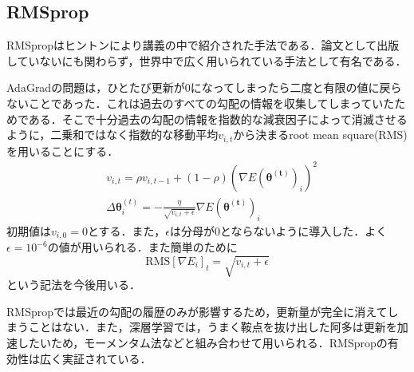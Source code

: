 \documentclass[a4paper,11pt]{jsreport}
\begin{document}
\subsection{RMSprop}
RMSpropはヒントンにより講義の中で紹介された手法である．論文として出版していないにも関わらず，世界中で広く用いられている手法として有名である．\par
AdaGradの問題は，ひとたび更新が$0$になってしまったら二度と有限の値に戻らないことであった．これは過去のすべての勾配の情報を収集してしまっていたためである．そこで十分過去の勾配の情報を指数的な減衰因子によって消滅させるように，二乗和ではなく指数的な移動平均$v_{i,t}$から決まるroot mean square(RMS)を用いることにする．
\begin{align}
   & v_{i,t}
  = \rho v_{i,t-1} + (1-\rho) (\nabla E(\bm{\theta^{(t)}})_i)^2 \label{RMSprop} \\
   & \Delta \bm{\theta}_i^{(t)}
  = - \frac{\eta}{\sqrt{v_{i,t}+\epsilon}} \nabla E(\bm{\theta^{(t)}})_i
\end{align}
初期値は$v_{i,0}=0$とする．また，$\epsilon$は分母が$0$とならないように導入した．よく$\epsilon = 10^{-6}$の値が用いられる．また簡単のために
\begin{equation}
  \mathrm{RMS}[\nabla E_i]_t = \sqrt{v_{i,t} + \epsilon}
\end{equation}
という記法を今後用いる．\par
RMSpropでは最近の勾配の履歴のみが影響するため，更新量が完全に消えてしまうことはない．また，深層学習では，うまく鞍点を抜け出した阿多は更新を加速したいため，モーメンタム法などと組み合わせて用いられる．RMSpropの有効性は広く実証されている．
\end{document}
